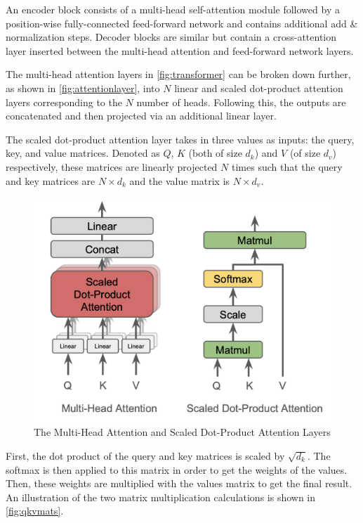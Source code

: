\documentclass[11pt]{article}
\begin{document}
An encoder block consists of a multi-head self-attention module followed by a position-wise fully-connected feed-forward network and contains additional add \& normalization steps. Decoder blocks are similar but contain a cross-attention layer inserted between the multi-head attention and feed-forward network layers.

The multi-head attention layers in \autoref{fig:transformer} can be broken down further, as shown in \autoref{fig:attentionlayer}, into $N$ linear and scaled dot-product attention layers corresponding to the $N$ number of heads. Following this, the outputs are concatenated and then projected via an additional linear layer. 

The scaled dot-product attention layer takes in three values as inputs: the query, key, and value matrices. Denoted as $Q$, $K$ (both of size $d_k$) and $V$ (of size $d_v$) respectively, these matrices are linearly projected $N$ times such that the query and key matrices are $N\times d_k$ and the value matrix is $N\times d_v$.
\begin{figure}[ht]
  \centering
  \includegraphics[width=\linewidth]{figures/attention.png}
  \caption{The Multi-Head Attention and Scaled Dot-Product Attention Layers}
 \label{fig:attentionlayer}
\end{figure}

First, the dot product of the query and key matrices is scaled by $\sqrt{d_k}$. The softmax is then applied to this matrix in order to get the weights of the values. Then, these weights are multiplied with the values matrix to get the final result. An illustration of the two matrix multiplication calculations is shown in \autoref{fig:qkvmats}.
\end{document}
